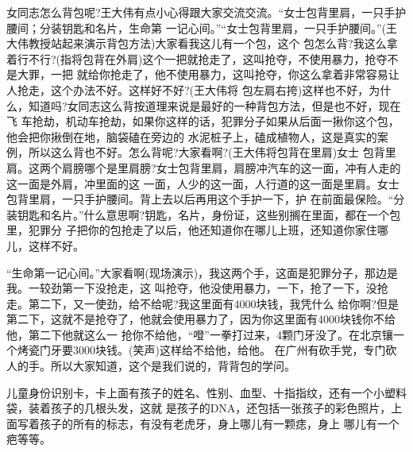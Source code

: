 \documentclass[11pt,a4paper,onecolumn]{article}
\begin{document}
女同志怎么背包呢?王大伟有点小心得跟大家交流交流。``女士包背里肩，一只手护腰间；分装钥匙和名片，生命第
一记心间。''``女士包背里肩，一只手护腰间。''(王大伟教授站起来演示背包方法)大家看我这儿有一个包，这个
包怎么背?我这么拿着行不行?(指将包背在外肩)这个一把就抢走了，这叫抢夺，不使用暴力，抢夺不是大罪，一把
就给你抢走了，他不使用暴力，这叫抢夺，你这么拿着非常容易让人抢走，这个办法不好。这样好不好?(王大伟将
包左肩右挎)这样也不好，为什么，知道吗?女同志这么背按道理来说是最好的一种背包方法，但是也不好，现在飞
车抢劫，机动车抢劫，如果你这样的话，犯罪分子如果从后面一揪你这个包，他会把你揪倒在地，脑袋磕在旁边的
水泥桩子上，磕成植物人，这是真实的案例，所以这么背也不好。怎么背呢?大家看啊?(王大伟将包背在里肩)女士
包背里肩。这两个肩膀哪个是里肩膀?女士包背里肩，肩膀冲汽车的这一面，冲有人走的这一面是外肩，冲里面的这
一面，人少的这一面，人行道的这一面是里肩。女士包背里肩，一只手护腰间。背上去以后再用这个手护一下，护
在前面最保险。``分装钥匙和名片。''什么意思啊?钥匙，名片，身份证，这些别搁在里面，都在一个包里，犯罪分
子把你的包抢走了以后，他还知道你在哪儿上班，还知道你家住哪儿，这样不好。

``生命第一记心间。''大家看啊(现场演示)，我这两个手，这面是犯罪分子，那边是我。一较劲第一下没抢走，这
叫抢夺，他没使用暴力，一下，抢了一下，没抢走。第二下，又一使劲，给不给呢?我这里面有4000块钱，我凭什么
给你啊?但是第二下，这就不是抢夺了，他就会使用暴力了，因为你这里面有4000块钱你不给他，第二下他就这么一
抢你不给他，``噔''一拳打过来，4颗门牙没了。在北京镶一个烤瓷门牙要3000块钱。(笑声)这样给不给他，给他。
在广州有砍手党，专门砍人的手。所以大家知道，这个是我们说的，背背包的学问。

儿童身份识别卡，卡上面有孩子的姓名、性别、血型、十指指纹，还有一个小塑料袋，装着孩子的几根头发，这就
是孩子的DNA，还包括一张孩子的彩色照片，上面写着孩子的所有的标志，有没有老虎牙，身上哪儿有一颗痣，身上
哪儿有一个疤等等。
\end{document}
